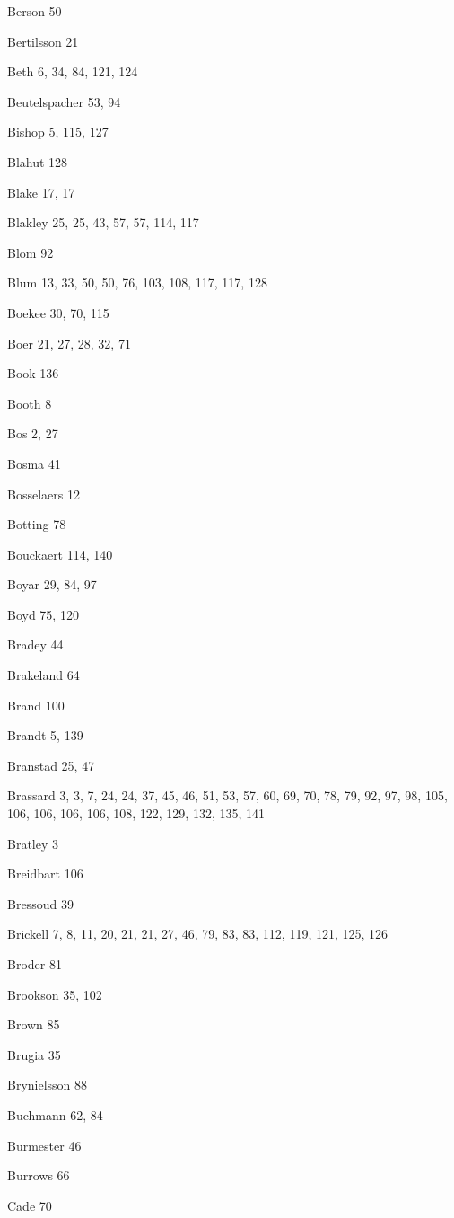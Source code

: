 \begin{theindex}
\item Berson 50
\item Bertilsson 21
\item Beth 6, 34, 84, 121, 124
\item Beutelspacher 53, 94
\item Bishop 5, 115, 127
\item Blahut 128
\item Blake 17, 17
\item Blakley 25, 25, 43, 57, 57, 114, 117
\item Blom 92
\item Blum 13, 33, 50, 50, 76, 103, 108, 117, 117, 128
\item Boekee 30, 70, 115
\item Boer 21, 27, 28, 32, 71
\item Book 136
\item Booth 8
\item Bos 2, 27
\item Bosma 41
\item Bosselaers 12
\item Botting 78
\item Bouckaert 114, 140
\item Boyar 29, 84, 97
\item Boyd 75, 120
\item Bradey 44
\item Brakeland 64
\item Brand 100
\item Brandt 5, 139
\item Branstad 25, 47
\item Brassard 3, 3, 7, 24, 24, 37, 45, 46, 51, 53, 57, 60, 69, 70, 78, 79, 92, 97, 98, 105, 106, 106, 106, 106, 108, 122, 129, 132, 135, 141
\item Bratley 3
\item Breidbart 106
\item Bressoud 39
\item Brickell 7, 8, 11, 20, 21, 21, 27, 46, 79, 83, 83, 112, 119, 121, 125, 126
\item Broder 81
\item Brookson 35, 102
\item Brown 85
\item Brugia 35
\item Brynielsson 88
\item Buchmann 62, 84
\item Burmester 46
\item Burrows 66
\item Cade 70

\end{theindex}
